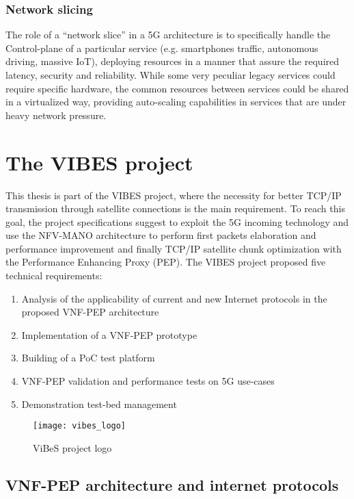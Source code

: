 \subsubsection{Network slicing}
The role of a ``network slice'' in a 5G architecture is to specifically handle 
the Control-plane of a particular 
service (e.g. smartphones traffic, autonomous driving, massive IoT), deploying 
resources in a manner that assure the required latency, security and 
reliability. While some very peculiar legacy services could require specific 
hardware, the common resources between services could be shared in a 
virtualized way, providing auto-scaling capabilities in services that are under 
heavy network pressure.

\section{The VIBES project}
 
 This thesis is part of the VIBES project, where the necessity for better TCP/IP
 transmission through satellite connections is the main requirement. To reach
 this goal, the project specifications suggest to exploit the 5G incoming
 technology and use the NFV-MANO architecture to perform first packets
 elaboration and performance improvement and finally TCP/IP satellite chunk
 optimization with the Performance Enhancing Proxy (PEP). The VIBES project
 proposed five technical requirements:
\begin{enumerate}
 \item Analysis of the applicability of current and new Internet protocols in
   the proposed VNF-PEP architecture
 \item Implementation of a VNF-PEP prototype
 \item Building of a PoC test platform
 \item VNF-PEP validation and performance tests on 5G use-cases
 \item Demonstration test-bed management
\end{enumerate}

\begin{figure}[t]
 \centering
 \texttt{[image: vibes\_logo]}
 \caption{ViBeS project logo}
 \label{chap:background:img:vibes_logo}
\end{figure}


\subsection{VNF-PEP architecture and internet protocols}

